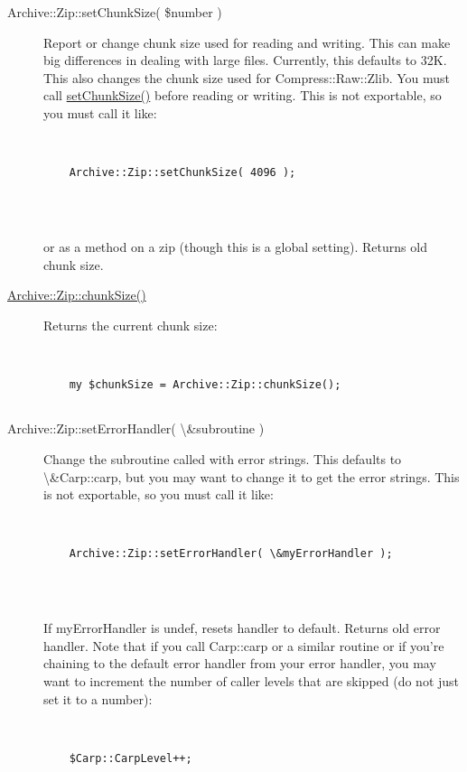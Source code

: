 \documentclass[]{article}
\renewcommand{\emph}[1]{\underline{#1}}
\begin{document}
\begin{description}
\item[Archive::Zip::setChunkSize( \$number )]
Report or change chunk size used for reading and writing. This can make
big differences in dealing with large files. Currently, this defaults to
32K. This also changes the chunk size used for Compress::Raw::Zlib. You
must call \emph{setChunkSize()} before reading or writing. This is not
exportable, so you must call it like:

~

\begin{verbatim}
    Archive::Zip::setChunkSize( 4096 );
    
\end{verbatim}

~

or as a method on a zip (though this is a global setting). Returns old
chunk size.
\end{description}

\begin{description}
\item[\emph{Archive::Zip::chunkSize()}]
Returns the current chunk size:

~

\begin{verbatim}
    my $chunkSize = Archive::Zip::chunkSize();
    
\end{verbatim}
\end{description}

\begin{description}
\item[Archive::Zip::setErrorHandler( \textbackslash{}\&subroutine )]
Change the subroutine called with error strings. This defaults to
\textbackslash{}\&Carp::carp, but you may want to change it to get the
error strings. This is not exportable, so you must call it like:

~

\begin{verbatim}
    Archive::Zip::setErrorHandler( \&myErrorHandler );
    
\end{verbatim}

~

If myErrorHandler is undef, resets handler to default. Returns old error
handler. Note that if you call Carp::carp or a similar routine or if
you're chaining to the default error handler from your error handler,
you may want to increment the number of caller levels that are skipped
(do not just set it to a number):

~

\begin{verbatim}
    $Carp::CarpLevel++;
    
\end{verbatim}
\end{description}
\end{document}
